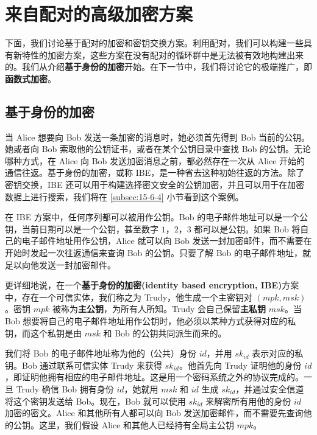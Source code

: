 \section{来自配对的高级加密方案}\label{sec:15-6}

下面，我们讨论基于配对的加密和密钥交换方案。利用配对，我们可以构建一些具有新特性的加密方案，这些方案在没有配对的循环群中是无法被有效地构建出来的。我们从介绍\textbf{基于身份的加密}开始。在下一节中，我们将讨论它的极端推广，即\textbf{函数式加密}。

\subsection{基于身份的加密}\label{subsec:15-6-1}

当 Alice 想要向 Bob 发送一条加密的消息时，她必须首先得到 Bob 当前的公钥。她或者向 Bob 索取他的公钥证书，或者在某个公钥目录中查找 Bob 的公钥。无论哪种方式，在 Alice 向 Bob 发送加密消息之前，都必然存在一次从 Alice 开始的通信往返。基于身份的加密，或称 IBE，是一种省去这种初始往返的方法。除了密钥交换，IBE 还可以用于构建选择密文安全的公钥加密，并且可以用于在加密数据上进行搜索，我们将在 \ref{subsec:15-6-4} 小节看到这个案例。

在 IBE 方案中，任何序列都可以被用作公钥。Bob 的电子邮件地址可以是一个公钥，当前日期可以是一个公钥，甚至数字 $1$，$2$，$3$ 都可以是公钥。如果 Bob 将自己的电子邮件地址用作公钥，Alice 就可以向 Bob 发送一封加密邮件，而不需要在开始时发起一次往返通信来查询 Bob 的公钥。只要了解 Bob 的电子邮件地址，就足以向他发送一封加密邮件。

更详细地说，在一个\textbf{基于身份的加密(identity based encryption, IBE)}方案中，存在一个可信实体，我们称之为 Trudy，他生成一个主密钥对 $(\mathit{mpk},\mathit{msk})$。密钥 $\mathit{mpk}$ 被称为\textbf{主公钥}，为所有人所知。Trudy 会自己保留\textbf{主私钥} $\mathit{msk}$。当 Bob 想要将自己的电子邮件地址用作公钥时，他必须以某种方式获得对应的私钥，而这个私钥是由 $\mathit{msk}$ 和 Bob 的公钥共同派生而来的。

我们将 Bob 的电子邮件地址称为他的（公共）身份 $\mathit{id}$，并用 $\mathit{sk}_\mathit{id}$ 表示对应的私钥。Bob 通过联系可信实体 Trudy 来获得 $\mathit{sk}_\mathit{id}$。他首先向 Trudy 证明他的身份 $\mathit{id}$，即证明他拥有相应的电子邮件地址。这是用一个密码系统之外的协议完成的。一旦 Trudy 确信 Bob 拥有身份 $\mathit{id}$，她就用 $\mathit{msk}$ 和 $\mathit{id}$ 生成 $\mathit{sk}_\mathit{id}$，并通过安全信道将这个密钥发送给 Bob。现在，Bob 就可以使用 $\mathit{sk}_\mathit{id}$ 来解密所有用他的身份 $\mathit{id}$ 加密的密文。Alice 和其他所有人都可以向 Bob 发送加密邮件，而不需要先查询他的公钥。这里，我们假设 Alice 和其他人已经持有全局主公钥 $\mathit{mpk}$。

